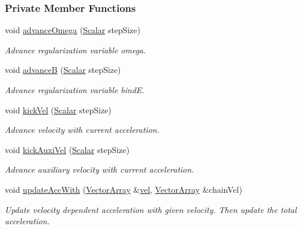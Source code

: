 \subsubsection*{Private Member Functions}
\begin{DoxyCompactItemize}
\item 
void \mbox{\hyperlink{class_a_rchain_ac54722bde3c9a15e04dd004ebcf0db5e}{advance\+Omega}} (\mbox{\hyperlink{class_a_rchain_a707e42a79e4744424a34c9007e84ee07}{Scalar}} step\+Size)
\begin{DoxyCompactList}\small\item\em Advance regularization variable omega. \end{DoxyCompactList}\item 
void \mbox{\hyperlink{class_a_rchain_a1b2ae6231caeba3df20e4ab41f63a4b8}{advanceB}} (\mbox{\hyperlink{class_a_rchain_a707e42a79e4744424a34c9007e84ee07}{Scalar}} step\+Size)
\begin{DoxyCompactList}\small\item\em Advance regularization variable bindE. \end{DoxyCompactList}\item 
void \mbox{\hyperlink{class_a_rchain_a0b073cd82321047d7fafda59cef998ef}{kick\+Vel}} (\mbox{\hyperlink{class_a_rchain_a707e42a79e4744424a34c9007e84ee07}{Scalar}} step\+Size)
\begin{DoxyCompactList}\small\item\em Advance velocity with current acceleration. \end{DoxyCompactList}\item 
void \mbox{\hyperlink{class_a_rchain_a53838a7890cee54c69786bda87dd6cd9}{kick\+Auxi\+Vel}} (\mbox{\hyperlink{class_a_rchain_a707e42a79e4744424a34c9007e84ee07}{Scalar}} step\+Size)
\begin{DoxyCompactList}\small\item\em Advance auxiliary velocity with current acceleration. \end{DoxyCompactList}\item 
void \mbox{\hyperlink{class_a_rchain_a92865bff07dc16e3065a8f695120a5f5}{update\+Acc\+With}} (\mbox{\hyperlink{class_a_rchain_a019fbadb9f4e5892736d9127537338bb}{Vector\+Array}} \&\mbox{\hyperlink{classparticle_system_a545da170c4d59f18c6ddb18817cb5f3e}{vel}}, \mbox{\hyperlink{class_a_rchain_a019fbadb9f4e5892736d9127537338bb}{Vector\+Array}} \&chain\+Vel)
\begin{DoxyCompactList}\small\item\em Update velocity dependent acceleration with given velocity. Then update the total acceleration. \end{DoxyCompactList}\item 

\end{DoxyCompactItemize}
